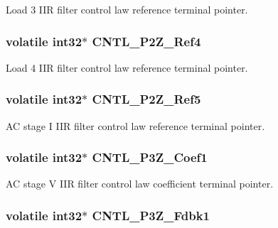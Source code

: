 Load 3 I\-I\-R filter control law reference terminal pointer. \hypertarget{a00014_af54c55f228deb8189c44282a94a870c1}{
\subsubsection[{C\-N\-T\-L\-\_\-2\-P2\-Z\-\_\-\-Ref4}]{\setlength{\rightskip}{0pt plus 5cm}volatile int32$\ast$ C\-N\-T\-L\-\_\-P2\-Z\-\_\-\-Ref4}}\label{a00014_af54c55f228deb8189c44282a94a870c1}
Load 4 I\-I\-R filter control law reference terminal pointer. \hypertarget{a00014_abd3b240e2d3f7d3f4f717066ee8efd3e}{
\subsubsection[{C\-N\-T\-L\-\_\-2\-P2\-Z\-\_\-\-Ref5}]{\setlength{\rightskip}{0pt plus 5cm}volatile int32$\ast$ C\-N\-T\-L\-\_\-P2\-Z\-\_\-\-Ref5}}\label{a00014_abd3b240e2d3f7d3f4f717066ee8efd3e}
A\-C stage I I\-I\-R filter control law reference terminal pointer. \hypertarget{a00014_a41005c53e7c439f0af28e140f7d3d0ed}{
\subsubsection[{C\-N\-T\-L\-\_\-3\-P3\-Z\-\_\-\-Coef1}]{\setlength{\rightskip}{0pt plus 5cm}volatile int32$\ast$ C\-N\-T\-L\-\_\-P3\-Z\-\_\-\-Coef1}}\label{a00014_a41005c53e7c439f0af28e140f7d3d0ed}
A\-C stage V I\-I\-R filter control law coefficient terminal pointer. \hypertarget{a00014_a361372a23d9146cd2d077e6c843ec47e}{
\subsubsection[{C\-N\-T\-L\-\_\-3\-P3\-Z\-\_\-\-Fdbk1}]{\setlength{\rightskip}{0pt plus 5cm}volatile int32$\ast$ C\-N\-T\-L\-\_\-P3\-Z\-\_\-\-Fdbk1}}\label{a00014_a361372a23d9146cd2d077e6c843ec47e}
